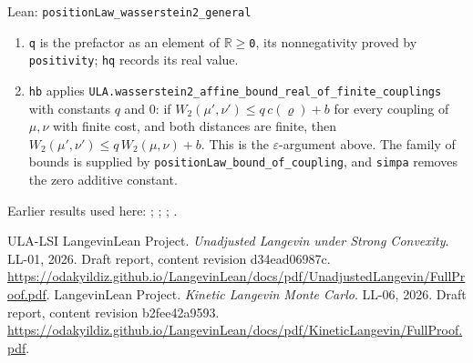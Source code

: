 \documentclass[11pt,a4paper]{article}
\begin{document}
\begin{leanbox}{Lean: \texttt{positionLaw\_\allowbreak{}wasserstein2\_\allowbreak{}general}}
\begin{enumerate}
\item \texttt{q} is the prefactor as an element of \texttt{\ensuremath{\mathbb R}\ensuremath{\ge}0}, its nonnegativity proved by \texttt{positivity}; \texttt{hq} records its real value.

\item \texttt{hb} applies \texttt{ULA.\allowbreak{}wasserstein2\_\allowbreak{}affine\_\allowbreak{}bound\_\allowbreak{}real\_\allowbreak{}of\_\allowbreak{}finite\_\allowbreak{}couplings} with constants \(q\) and \(0\): if \(W_2(\mu',\nu')\le q\,c(\varrho)+b\) for every coupling of \(\mu,\nu\) with finite cost, and both distances are finite, then \(W_2(\mu',\nu')\le q\,W_2(\mu,\nu)+b\). This is the \(\varepsilon\)-argument above. The family of bounds is supplied by \texttt{position\allowbreak{}Law\_\allowbreak{}bound\_\allowbreak{}of\_\allowbreak{}coupling}, and \texttt{simpa} removes the zero additive constant.

\end{enumerate}
\end{leanbox}


Earlier results used here: \cite[Section~3.17.3]{LangevinLean2026ULASC}; \cite[Section~3.17.4]{LangevinLean2026ULASC}; \cite[Section~3.18.4]{LangevinLean2026ULASC}; \cite[Section~3.21.2]{LangevinLean2026ULASC}.

\begin{thebibliography}{ULA-LSI}
LangevinLean Project. \emph{Unadjusted Langevin under Strong Convexity}. LL-01, 2026. Draft report, content revision d34ead06987c. \url{https://odakyildiz.github.io/LangevinLean/docs/pdf/UnadjustedLangevin/FullProof.pdf}.
LangevinLean Project. \emph{Kinetic Langevin Monte Carlo}. LL-06, 2026. Draft report, content revision b2fee42a9593. \url{https://odakyildiz.github.io/LangevinLean/docs/pdf/KineticLangevin/FullProof.pdf}.
\end{thebibliography}
\end{document}
